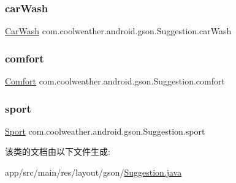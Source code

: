 \subsubsection{\texorpdfstring{carWash}{carWash}}
{\footnotesize\ttfamily \mbox{\hyperlink{classcom_1_1coolweather_1_1android_1_1gson_1_1_suggestion_1_1_car_wash}{Car\+Wash}} com.\+coolweather.\+android.\+gson.\+Suggestion.\+car\+Wash}

\mbox{\label{classcom_1_1coolweather_1_1android_1_1gson_1_1_suggestion_ac58db4ed30223d615220ce71276bec67}} 
\subsubsection{\texorpdfstring{comfort}{comfort}}
{\footnotesize\ttfamily \mbox{\hyperlink{classcom_1_1coolweather_1_1android_1_1gson_1_1_suggestion_1_1_comfort}{Comfort}} com.\+coolweather.\+android.\+gson.\+Suggestion.\+comfort}

\mbox{\label{classcom_1_1coolweather_1_1android_1_1gson_1_1_suggestion_a2f861e694c9e9626ddcf7b48ec31efda}} 
\subsubsection{\texorpdfstring{sport}{sport}}
{\footnotesize\ttfamily \mbox{\hyperlink{classcom_1_1coolweather_1_1android_1_1gson_1_1_suggestion_1_1_sport}{Sport}} com.\+coolweather.\+android.\+gson.\+Suggestion.\+sport}



该类的文档由以下文件生成\+:\begin{DoxyCompactItemize}
\item 
app/src/main/res/layout/gson/\mbox{\hyperlink{res_2layout_2gson_2_suggestion_8java}{Suggestion.\+java}}\end{DoxyCompactItemize}
